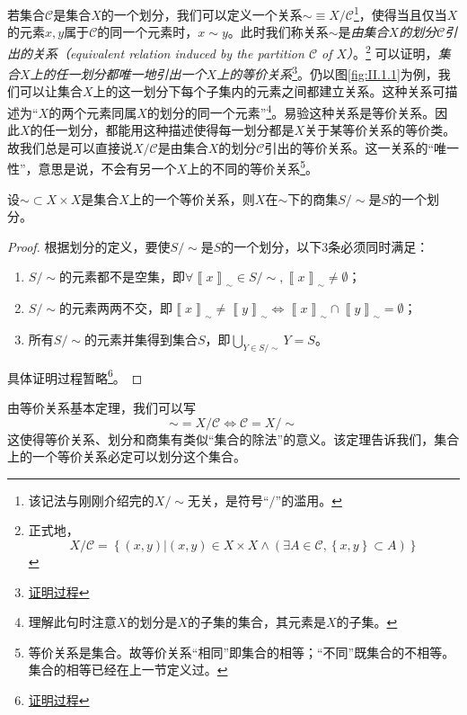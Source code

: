 \documentclass[../main.tex]{subfiles}
\begin{document}
若集合$\mathcal{C}$是集合$X$的一个划分，我们可以定义一个关系$\sim\equiv X/\mathcal{C}$\footnote{该记法与刚刚介绍完的$X/\sim$无关，是符号“$/$”的滥用。}，使得当且仅当$X$的元素$x,y$属于$\mathcal{C}$的同一个元素时，$x\sim y$。此时我们称关系$\sim$是\emph{由集合$X$的划分$\mathcal{C}$引出的关系（equivalent relation induced by the partition $\mathcal{C}$ of $X$）}。\footnote{正式地，
    \[
        X/\mathcal{C}=\left\{\left(x,y\right)|\left(x,y\right)\in X\times X\wedge\left(\exists A\in \mathcal{C},\left\{x,y\right\}\subset A\right)\right\}
    \]
}
可以证明，\emph{集合$X$上的任一划分都唯一地引出一个$X$上的等价关系}\footnote{\href{https://proofwiki.org/wiki/Relation_Induced_by_Partition_is_Equivalence}{证明过程}}。仍以图\ref{fig:II.1.1}为例，我们可以让集合$X$上的这一划分下每个子集内的元素之间都建立关系。这种关系可描述为“$X$的两个元素同属$X$的划分的同一个元素”\footnote{理解此句时注意$X$的划分是$X$的子集的集合，其元素是$X$的子集。}。易验这种关系是等价关系。因此$X$的任一划分，都能用这种描述使得每一划分都是$X$关于某等价关系的等价类。故我们总是可以直接说$X/\mathcal{C}$是由集合$X$的划分$\mathcal{C}$引出的等价关系。这一关系的“唯一性”，意思是说，不会有另一个$X$上的不同的等价关系\footnote{等价关系是集合。故等价关系“相同”即集合的相等；“不同”既集合的不相等。集合的相等已经在上一节定义过。}。

\begin{theorem}[等价关系基本定理]
    设$\sim\subset X\times X$是集合$X$上的一个等价关系，则$X$在$\sim$下的商集$S/\sim$是$S$的一个划分。
\end{theorem}
\begin{proof}
    根据划分的定义，要使$S/\sim$是$S$的一个划分，以下3条必须同时满足：
    \begin{enumerate}
        \item $S/\sim$的元素都不是空集，即$\forall\left\llbracket x\right\rrbracket_\sim\in S/\sim,\left\llbracket x\right\rrbracket_\sim\neq\emptyset$；
        \item $S/\sim$的元素两两不交，即$\left\llbracket x\right\rrbracket_\sim\neq\left\llbracket y\right\rrbracket_\sim\Leftrightarrow\left\llbracket x\right\rrbracket_\sim\cap\left\llbracket y\right\rrbracket_\sim=\emptyset$；
        \item 所有$S/\sim$的元素并集得到集合$S$，即$\bigcup_{Y\in S/\sim}Y=S$。
    \end{enumerate}
    具体证明过程暂略\footnote{\href{https://proofwiki.org/wiki/Fundamental_Theorem_on_Equivalence_Relations}{证明过程}}。
\end{proof}

由等价关系基本定理，我们可以写
\[
    \sim=X/\mathcal{C}\Leftrightarrow \mathcal{C}=X/\sim
\]
这使得等价关系、划分和商集有类似“集合的除法”的意义。该定理告诉我们，集合上的一个等价关系必定可以划分这个集合。
\end{document}
